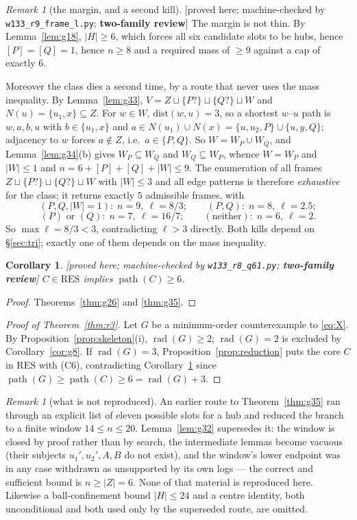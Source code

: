 \documentclass[11pt]{article}
\theoremstyle{plain}
\newtheorem{corollary}[theorem]{Corollary}
\theoremstyle{definition}
\theoremstyle{remark}
\newtheorem{remark}[theorem]{Remark}
\numberwithin{equation}{section}
\newcommand{\rad}{\operatorname{rad}}
\newcommand{\pth}{\operatorname{path}}
\newcommand{\statusbox}[1]{{\small\sloppy\textsf{[#1]}}}
\newcommand{\REV}[1]{\statusbox{proved here; machine-checked by \texttt{#1};
\textbf{two-family review}}}
\begin{document}
\begin{remark}[the margin, and a second kill]\label{rem:secondkill}
\REV{w133\_r9\_frame\_l.py}
The margin is not thin. By Lemma~\ref{lem:g18}, $|H|\ge 6$, which forces all six candidate
slots to be hubs, hence $[P]=[Q]=1$, hence $n \ge 8$ and a required mass of $\ge 9$ against a
cap of exactly $6$.

Moreover the class dies a second time, by a route that never uses the mass inequality. By
Lemma~\ref{lem:g33}, $V = Z\sqcup\{P?\}\sqcup\{Q?\}\sqcup W$ and $N(u) = \{u_1,x\}\subseteq
Z$. For $w \in W$, $\mathrm{dist}(w,u) = 3$, so a shortest $w$--$u$ path is $w,a,b,u$ with
$b \in \{u_1,x\}$ and $a \in N(u_1)\cup N(x) = \{u,u_2,P\}\cup\{u,y,Q\}$; adjacency to $w$
forces $a \notin Z$, i.e.\ $a \in \{P,Q\}$. So $W = W_P\cup W_Q$, and
Lemma~\ref{lem:g34}(b) gives $W_P \subseteq W_Q$ and $W_Q\subseteq W_P$, whence $W = W_P$ and
$|W| \le 1$ and $n = 6 + [P]+[Q]+|W| \le 9$. The enumeration of all frames
$Z \sqcup\{P?\}\sqcup\{Q?\}\sqcup W$ with $|W|\le 3$ and all edge patterns is therefore
\emph{exhaustive} for the class; it returns exactly $5$ admissible frames, with
\[
 (P,Q,|W|{=}1):\; n=9,\ \ell = 8/3; \qquad (P,Q):\; n=8,\ \ell=2.5;
\]
\[
 (P) \text{ or } (Q):\; n=7,\ \ell=16/7; \qquad (\text{neither}):\; n=6,\ \ell=2 .
\]
So $\max \ell = 8/3 < 3$, contradicting $\ell > 3$ directly. Both kills depend on
\S\ref{sec:tri}; exactly one of them depends on the mass inequality.
\end{remark}

\begin{corollary}\label{cor:g35.1}
\REV{w133\_r8\_q61.py}
$C \in \mathrm{RES}$ implies $\pth(C)\ge 6$.
\end{corollary}

\begin{proof}
Theorems~\ref{thm:g26} and \ref{thm:g35}.
\end{proof}

\begin{proof}[Proof of Theorem~\ref{thm:r3}]
Let $G$ be a minimum-order counterexample to \eqref{eq:X}. By
Proposition~\ref{prop:skeleton}(i), $\rad(G)\ge 2$; $\rad(G) = 2$ is excluded by
Corollary~\ref{cor:g8}. If $\rad(G) = 3$, Proposition~\ref{prop:reduction} puts the core $C$
in $\mathrm{RES}$ with (C6), contradicting Corollary~\ref{cor:g35.1} since
$\pth(G)\ge\pth(C)\ge 6 = \rad(G)+3$.
\end{proof}

\begin{remark}[what is not reproduced]
An earlier route to Theorem~\ref{thm:g35} ran through an explicit list of eleven possible
slots for a hub and reduced the branch to a finite window $14 \le n \le 20$. Lemma~\ref{lem:g32}
supersedes it: the window is closed by proof rather than by search, the intermediate lemmas
become vacuous (their subjects $u_1',u_2',A,B$ do not exist), and the window's lower endpoint
was in any case withdrawn as unsupported by its own logs --- the correct and sufficient bound
is $n \ge |Z| = 6$. None of that material is reproduced here. Likewise a ball-confinement
bound $|H| \le 24$ and a centre identity, both unconditional and both used only by the
superseded route, are omitted.
\end{remark}
\end{document}
